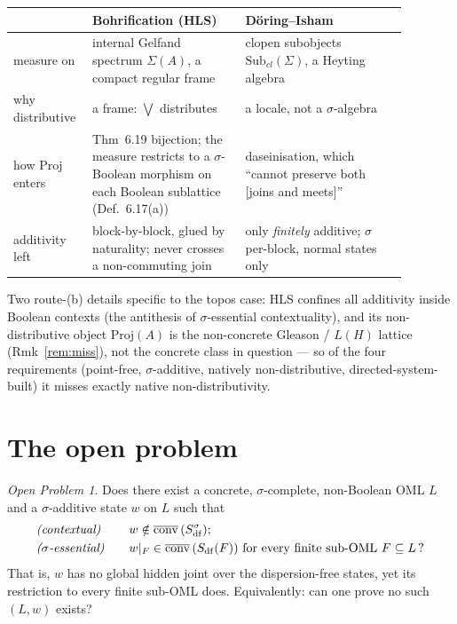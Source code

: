 \documentclass[11pt,reqno]{amsart}
\theoremstyle{plain}
\theoremstyle{definition}
\theoremstyle{remark}
\newtheorem*{problem}{Open Problem}
\begin{document}
\begin{center}
\renewcommand{\arraystretch}{1.35}
\begin{tabular}{@{}>{\raggedright\arraybackslash}p{0.14\linewidth}>{\raggedright\arraybackslash}p{0.36\linewidth}>{\raggedright\arraybackslash}p{0.38\linewidth}@{}}
\toprule
 & \textbf{Bohrification (HLS)} & \textbf{D\"{o}ring--Isham} \\
\midrule
measure on
  & internal Gelfand spectrum $\Sigma(A)$, a compact regular frame
  & clopen subobjects $\mathrm{Sub}_{cl}(\Sigma)$, a Heyting algebra \\
why distributive
  & a frame: $\bigvee$ distributes \cite[Def.~6.11]{HeunenLandsmanSpitters2011}
  & a locale, not a $\sigma$-algebra \cite{Doering2009measures} \\
how $\mathrm{Proj}$ enters
  & Thm~6.19 bijection; the measure restricts to a $\sigma$-Boolean morphism on each
    Boolean sublattice (Def.~6.17(a))
  & daseinisation, which ``cannot preserve both [joins and meets]''
    \cite{Wolters2013} \\
additivity left
  & block-by-block, glued by naturality; never crosses a non-commuting join
  & only \emph{finitely} additive; $\sigma$ per-block, normal states only \\
\bottomrule
\end{tabular}
\end{center}

\noindent Two route-(b) details specific to the topos case: HLS confines all
additivity inside Boolean contexts (the antithesis of $\sigma$-essential
contextuality), and its non-distributive object $\mathrm{Proj}(A)$ is the
non-concrete Gleason / $L(H)$ lattice (Rmk~\ref{rem:miss}), not the concrete class in
question --- so of the four requirements (point-free, $\sigma$-additive, natively
non-distributive, directed-system-built) it misses exactly native non-distributivity.

\section{The open problem}
\label{sec:problem}

\begin{problem}
Does there exist a concrete, $\sigma$-complete, non-Boolean OML $L$ and a
$\sigma$-additive state $w$ on $L$ such that
\[
  \begin{aligned}
  &\text{\emph{(contextual)}} && w\notin\overline{\mathrm{conv}}\,(S_{\mathrm{df}}^\sigma);\\
  &\text{\emph{($\sigma$-essential)}} &\quad& w|_F\in\overline{\mathrm{conv}}\,
    (S_{\mathrm{df}}(F))\ \text{for every finite sub-OML }F\subseteq L\,?
  \end{aligned}
\]
That is, $w$ has no global hidden joint over the dispersion-free states, yet its
restriction to every finite sub-OML does. Equivalently: can one prove no such
$(L,w)$ exists?
\end{problem}
\end{document}
